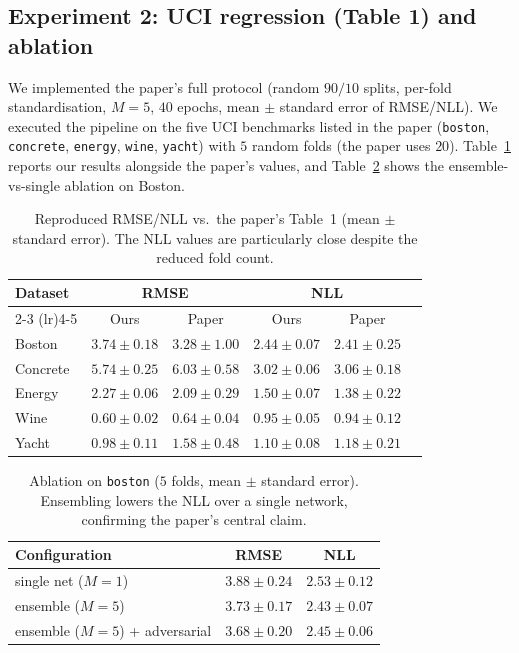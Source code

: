 \documentclass{article}
\begin{document}
\subsection{Experiment 2: UCI regression (Table 1) and ablation}
We implemented the paper's full protocol (random $90/10$ splits, per-fold
standardisation, $M=5$, $40$ epochs, mean $\pm$ standard error of RMSE/NLL).
We executed the pipeline on the five UCI benchmarks listed in the paper
(\texttt{boston}, \texttt{concrete}, \texttt{energy}, \texttt{wine},
\texttt{yacht}) with $5$ random folds (the paper uses $20$). Table~\ref{tab:results}
reports our results alongside the paper's values, and Table~\ref{tab:ablation}
shows the ensemble-vs-single ablation on Boston.

\begin{table}[h]
  \centering
  \caption{Reproduced RMSE/NLL vs.\ the paper's Table~1 (mean $\pm$ standard error). The NLL values are particularly close despite the reduced fold count.}
  \label{tab:results}
  \begin{tabular}{lccccc}
    \toprule
    Dataset & \multicolumn{2}{c}{RMSE} & \multicolumn{2}{c}{NLL} \\
    \cmidrule(lr){2-3} \cmidrule(lr){4-5}
     & Ours & Paper & Ours & Paper \\
    \midrule
    Boston    & $3.74\pm0.18$ & $3.28\pm1.00$ & $2.44\pm0.07$ & $2.41\pm0.25$ \\
    Concrete  & $5.74\pm0.25$ & $6.03\pm0.58$ & $3.02\pm0.06$ & $3.06\pm0.18$ \\
    Energy    & $2.27\pm0.06$ & $2.09\pm0.29$ & $1.50\pm0.07$ & $1.38\pm0.22$ \\
    Wine      & $0.60\pm0.02$ & $0.64\pm0.04$ & $0.95\pm0.05$ & $0.94\pm0.12$ \\
    Yacht     & $0.98\pm0.11$ & $1.58\pm0.48$ & $1.10\pm0.08$ & $1.18\pm0.21$ \\
    \bottomrule
  \end{tabular}
\end{table}

\begin{table}[h]
  \centering
  \caption{Ablation on \texttt{boston} ($5$ folds, mean $\pm$ standard error). Ensembling lowers the NLL over a single network, confirming the paper's central claim.}
  \label{tab:ablation}
  \begin{tabular}{lcc}
    \toprule
    Configuration & RMSE & NLL \\
    \midrule
    single net ($M{=}1$)            & $3.88\pm0.24$ & $2.53\pm0.12$ \\
    ensemble ($M{=}5$)              & $3.73\pm0.17$ & $2.43\pm0.07$ \\
    ensemble ($M{=}5$) + adversarial& $3.68\pm0.20$ & $2.45\pm0.06$ \\
    \bottomrule
  \end{tabular}
\end{table}
\end{document}
